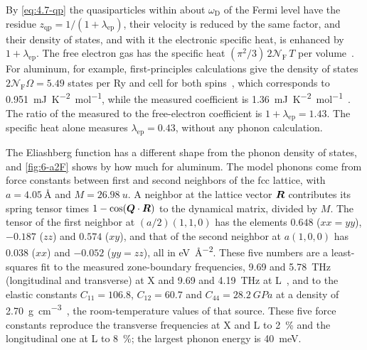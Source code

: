 By \cref{eq:4.7-qp} the quasiparticles within about $\omega_{\mathrm{D}}$ of the Fermi level have the residue $z_{\mathrm{qp}} = 1/(1 + \lambda_{\mathrm{ep}})$, their velocity is reduced by the same factor, and their density of states, and with it the electronic specific heat, is enhanced by $1 + \lambda_{\mathrm{ep}}$. The free electron gas has the specific heat $(\pi^2/3)\,2\mathcal{N}_{\mathrm{F}}\,T$ per volume~\cite[Chap.~2]{ashcroft1976solid}. For aluminum, for example, first-principles calculations give the density of states $2\mathcal{N}_{\mathrm{F}}\Omega = 5.49$ states per Ry and cell for both spins~\cite[Table~II]{savrasov1996electron}, which corresponds to \SI{0.951}{mJ.K^{-2}.mol^{-1}}, while the measured coefficient is \SI{1.36}{mJ.K^{-2}.mol^{-1}}~\cite[Table~II]{savrasov1996electron}. The ratio of the measured to the free-electron coefficient is $1 + \lambda_{\mathrm{ep}} = 1.43$. The specific heat alone measures $\lambda_{\mathrm{ep}} = 0.43$, without any phonon calculation.

The Eliashberg function has a different shape from the phonon density of states, and \cref{fig:6-a2F} shows by how much for aluminum. The model phonons come from force constants between first and second neighbors of the fcc lattice, with $a = \SI{4.05}{\angstrom}$ and $M = \SI{26.98}{u}$. A neighbor at the lattice vector $\bm{R}$ contributes its spring tensor times $1 - \cos(\bm{Q}\cdot\bm{R})$ to the dynamical matrix, divided by $M$. The tensor of the first neighbor at $(a/2)(1,1,0)$ has the elements $0.648$ ($xx = yy$), $-0.187$ ($zz$) and $0.574$ ($xy$), and that of the second neighbor at $a(1,0,0)$ has $0.038$ ($xx$) and $-0.052$ ($yy = zz$), all in \si{eV.\angstrom^{-2}}. These five numbers are a least-squares fit to the measured zone-boundary frequencies, 9.69 and \SI{5.78}{THz} (longitudinal and transverse) at X and 9.69 and \SI{4.19}{THz} at L~\cite[Table~I]{savrasov1996electron}, and to the elastic constants $C_{11} = 106.8$, $C_{12} = 60.7$ and $C_{44} = \SI{28.2}{GPa}$ at a density of \SI{2.70}{g.cm^{-3}}~\cite{kittel2005introduction}, the room-temperature values of that source. These five force constants reproduce the transverse frequencies at X and L to \SI{2}{\percent} and the longitudinal one at L to \SI{8}{\percent}; the largest phonon energy is \SI{40}{meV}.

